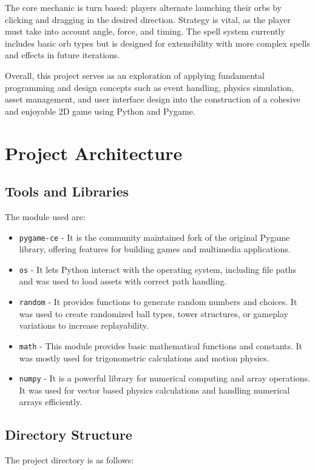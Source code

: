 \documentclass[10.5pt]{article}
\begin{document}
The core mechanic is turn based: players alternate launching their orbs by clicking and dragging in the desired direction. Strategy is vital, as the player must take into account angle, force, and timing. The spell system currently includes basic orb types but is designed for extensibility with more complex spells and effects in future iterations.

Overall, this project serves as an exploration of applying fundamental programming and design concepts such as event handling, physics simulation, asset management, and user interface design into the construction of a cohesive and enjoyable 2D game using Python and Pygame.

\section{Project Architecture}
\subsection{Tools and Libraries}
The module used are:
\begin{itemize}
        \item \texttt{pygame-ce} - It is the community maintained fork of the original Pygame library, offering features for building games and multimedia applications.
        \item \texttt{os} - It lets Python interact with the operating system, including file paths and was used to load assets with correct path handling.
        \item \texttt{random} - It provides functions to generate random numbers and choices. It was used to create randomized ball types, tower structures, or gameplay variations to increase replayability.
        \item \texttt{math} - This module provides basic mathematical functions and constants. It was mostly used for trigonometric calculations and motion physics.
        \item \texttt{numpy} - It is a powerful library for numerical computing and array operations. It was used for vector based physics calculations and handling numerical arrays efficiently.
    \end{itemize}

\newpage

\subsection{Directory Structure}\label{sec:directory-structure}
    The project directory is as follows:
\end{document}
